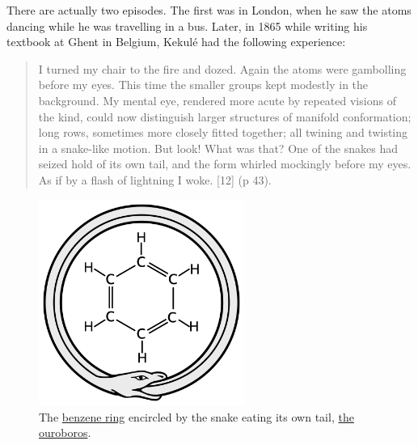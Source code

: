 \documentclass[
  12pt,
  british,
  a4paper,
]{article}
\begin{document}
There are actually two episodes. The first was in London, when he saw
the atoms dancing while he was travelling in a bus. Later, in 1865 while
writing his textbook at Ghent in Belgium, Kekulé had the following
experience:

\begin{quote}
I turned my chair to the fire and dozed. Again the atoms were gambolling
before my eyes. This time the smaller groups kept modestly in the
background. My mental eye, rendered more acute by repeated visions of
the kind, could now distinguish larger structures of manifold
conformation; long rows, sometimes more closely fitted together; all
twining and twisting in a snake-like motion. But look! What was that?
One of the snakes had seized hold of its own tail, and the form whirled
mockingly before my eyes. As if by a flash of lightning I woke. {[}12{]}
(p 43).
\end{quote}

\begin{figure}
\hypertarget{fig:benzene}{%
\centering
\includegraphics[width=0.6\textwidth,height=\textheight]{images/ouroboros-benzene.svg}
\caption[The
\href{https://en.wikipedia.org/wiki/Benzene\#Structure}{benzene ring}
encircled by the snake eating its own tail,
\href{https://en.wikipedia.org/wiki/Ouroboros}{the ouroboros}.]{The
\href{https://en.wikipedia.org/wiki/Benzene\#Structure}{benzene ring}
encircled by the snake eating its own tail,
\href{https://en.wikipedia.org/wiki/Ouroboros}{the
ouroboros}.\footnotemark{}}\label{fig:benzene}
}
\end{figure}
\end{document}
